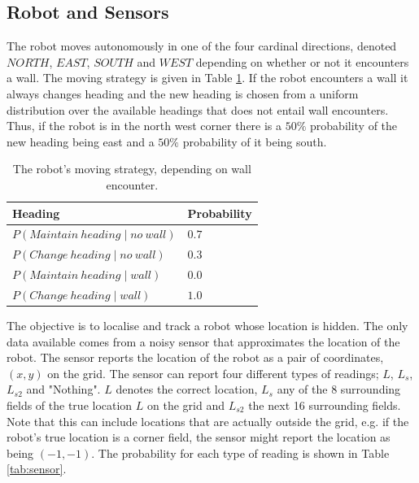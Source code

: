 \documentclass{article}
\begin{document}
\subsection{Robot and Sensors}\label{sec:robots}
The robot moves autonomously in one of the four cardinal directions, denoted $NORTH$, $EAST$, $SOUTH$ and $WEST$ depending on whether or not it encounters a wall. The moving strategy is given in Table \ref{tab:robot}. If the robot encounters a wall it always changes heading and the new heading is chosen from a uniform distribution over the available headings that does not entail wall encounters. Thus, if the robot is in the north west corner there is a $50\%$ probability of the new heading being east and a $50\%$ probability of it being south.
\begin{table}[ht]
\centering
  \begin{tabular}{ | l | l | }
    \hline
    \textbf{Heading}                            & \textbf{Probability}  \\ \hline
    $P(Maintain\ heading \mid no\ wall)$      & $0.7$                 \\ \hline
    $P(Change\ heading \mid no\ wall)$        & $0.3$                 \\ \hline
    $P(Maintain\ heading \mid wall)$          & $0.0$                 \\ \hline
    $P(Change\ heading \mid wall)$            & $1.0$                 \\ \hline
  \end{tabular}
  \caption{The robot's moving strategy, depending on wall encounter.}
  \label{tab:robot}
\end{table}

The objective is to localise and track a robot whose location is hidden. The only data available comes from a noisy sensor that approximates the location of the robot. The sensor reports the location of the robot as a pair of coordinates, $(x, y)$ on the grid. The sensor can report four different types of readings; $L$, $L_s$, $L_{s2}$ and "Nothing". $L$ denotes the correct location, $L_s$ any of the $8$ surrounding fields of the true location $L$ on the grid and $L_{s2}$ the next 16 surrounding fields. Note that this can include locations that are actually outside the grid, e.g. if the robot's true location is a corner field, the sensor might report the location as being $(-1, -1)$. The probability for each type of reading is shown in Table \ref{tab:sensor}.
\end{document}
